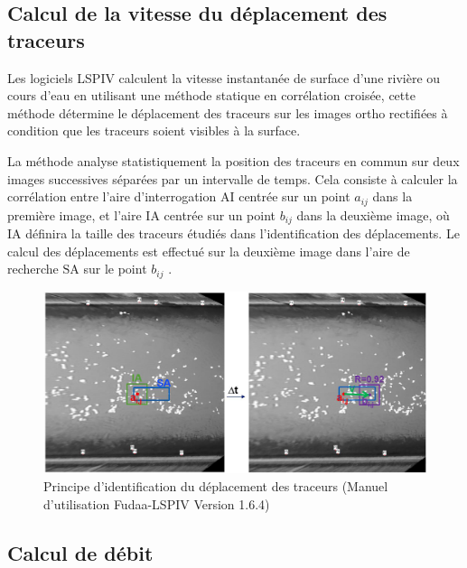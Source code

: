 \documentclass[
]{article}
\begin{document}
\hypertarget{calcul-de-la-vitesse-du-duxe9placement-des-traceurs}{%
\subsection{Calcul de la vitesse du déplacement des traceurs}\label{calcul-de-la-vitesse-du-duxe9placement-des-traceurs}}

Les logiciels LSPIV calculent la vitesse instantanée de surface d'une rivière ou cours d'eau en utilisant une méthode statique en corrélation croisée, cette méthode détermine le déplacement des traceurs sur les images ortho rectifiées à condition que les traceurs soient visibles à la surface.

La méthode analyse statistiquement la position des traceurs en commun sur deux images successives séparées par un intervalle de temps. Cela consiste à calculer la corrélation entre l'aire d'interrogation \(\text{AI}\) centrée sur un point \(a_{ij}\) dans la première image, et l'aire \(\text{IA}\) centrée sur un point \(b_{ij}\) dans la deuxième image, où \(\text{IA}\) définira la taille des traceurs étudiés dans l'identification des déplacements. Le calcul des déplacements est effectué sur la deuxième image dans l'aire de recherche \(\text{SA}\) sur le point \(b_{ij}\) .



\begin{figure}[H]
\includegraphics[width=1\linewidth,]{images/calculationdevitesse} \caption{Principe d'identification du déplacement des traceurs (Manuel d'utilisation Fudaa-LSPIV Version 1.6.4)}\label{fig:unnamed-chunk-4}
\end{figure}

\hypertarget{calcul-de-duxe9bit}{%
\subsection{Calcul de débit}\label{calcul-de-duxe9bit}}
\end{document}
